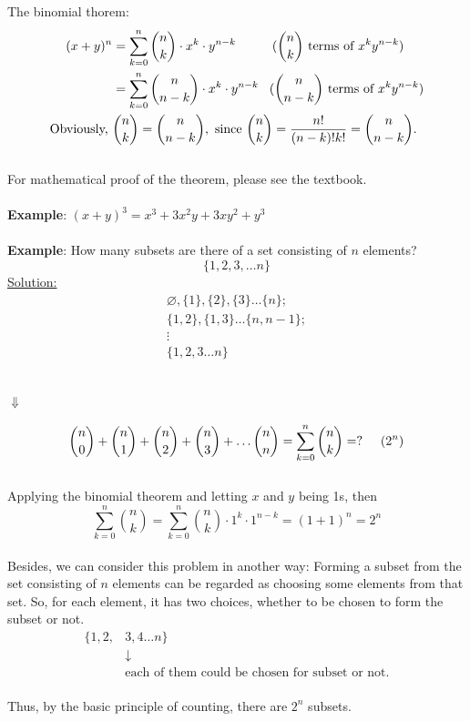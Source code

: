 \documentclass[11pt, letterpaper]{article}
\begin{document}
\noindent
The binomial thorem:
\begin{align*}
  (x+y)^n &= \sum_{k=0}^n \binom{n}{k} \cdot x^k \cdot y^{n-k} \hspace{1.0cm} (\binom{n}{k} \text{ terms of } x^k y^{n-k}) \\
  &= \sum_{k=0}^n \binom{n}{n-k} \cdot x^k \cdot y^{n-k} \hspace{0.3cm} (\binom{n}{n-k} \text{ terms of } x^k y^{n-k}) \\
  \text{Obviously, } &\binom{n}{k} = \binom{n}{n-k}, \text{ since } \binom{n}{k} = \frac{n!}{(n-k)!k!} = \binom{n}{n-k}.
\end{align*} \\
For mathematical proof of the theorem, please see the textbook. \\ \\
\noindent
\textbf{Example}: $(x+y)^3 = x^3 + 3x^2y + 3xy^2 + y^3$ \\ \\
\noindent
\textbf{Example}: How many subsets are there of a set consisting of $n$ elements?
\begin{equation*}
  \{1,2,3, \dots n\}
\end{equation*}
\noindent
\underline{Solution:}
\begin{equation*}
  \begin{array}{l}
    \varnothing, \{1\}, \{2\}, \{3\} \dots \{n\}; \\
    \{1,2\}, \{1,3\} \dots \{n, n-1\}; \\
    \vdots \\
    \{1,2,3 \dots n\}
  \end{array}
\end{equation*} \\
\begin{center}
$\Downarrow$ \\
\end{center}
\begin{equation*}
  \binom{n}{0} + \binom{n}{1} + \binom{n}{2} + \binom{n}{3} + \dots \binom{n}{n} = \sum_{k=0}^n \binom{n}{k} = ? \hspace{0.5cm} (2^n)
\end{equation*} \\
Applying the binomial theorem and letting $x$ and $y$ being 1s, then
\begin{equation*}
  \sum_{k=0}^n \binom{n}{k} = \sum_{k=0}^n \binom{n}{k}\cdot1^k\cdot1^{n-k} = (1+1)^n = 2^n
\end{equation*} \\
Besides, we can consider this problem in another way: Forming a subset from the set consisting of $n$ elements can be regarded as choosing some elements from that set. So, for each element, it has two choices, whether to be chosen to form the subset or not.
\begin{align*}
  \{1, 2, &3, 4\dots n\} \\
  &\downarrow \\
  &\text{each of them could be chosen for subset or not.}
\end{align*} \\
Thus, by the basic principle of counting, there are $2^n$ subsets.
\end{document}
